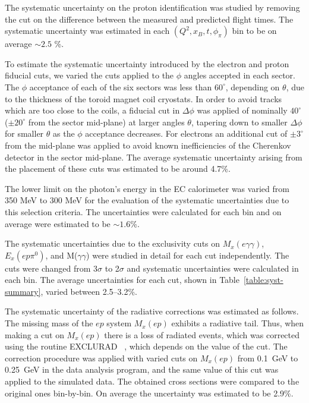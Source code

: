 \documentclass[prc,floatfix,twocolumn,superscriptaddress,letter]{revtex4}
\begin{document}
The systematic uncertainty on the  proton  identification was studied by removing the cut  on the
difference between the measured and predicted flight times. The systematic uncertainty was estimated  in each  $(Q^2, x_B, t, \phi_\pi)$ bin to be on average $\sim 2.5$ \%.

 To estimate the systematic uncertainty introduced by the electron and proton fiducial cuts, we varied  the cuts  applied to the $\phi$ angles accepted in each sector. The $\phi$ acceptance of each  of the six sectors was  less than $60^\circ$, depending on $\theta$, due to the thickness of the toroid magnet coil cryostats.   In order to avoid tracks which are too close to the coils, a fiducial cut in $\Delta\phi$ was applied of nominally $40^\circ$ ($\pm 20^\circ$ from the sector mid-plane) at larger angles $\theta$, tapering down to smaller $\Delta\phi$  for smaller $\theta$ as the  $\phi$ acceptance decreases. For electrons an additional cut of $\pm 3^\circ$ from the mid-plane was applied to avoid known inefficiencies of the Cherenkov detector in the sector mid-plane. The average systematic uncertainty arising from the placement of these cuts was estimated to be around 4.7\%.

The lower limit on the photon's energy in the EC calorimeter was varied from 350 MeV to 300 MeV for the evaluation of the systematic uncertainties due to this selection criteria. The uncertainties  were calculated for each bin and on average were  estimated to be $\sim1.6$\%.


The systematic uncertainties due to the exclusivity cuts on
 $M_x(e\gamma\gamma)$,
$E_x(ep\pi^0)$, and
M($\gamma\gamma$)
were studied in detail for each cut independently. The cuts were changed from 3$\sigma$ to 2$\sigma$ and
systematic uncertainties  were calculated in each bin. The average uncertainties for each cut, shown in Table~\ref{table:syst-summary}, varied between 2.5--3.2\%.


The systematic uncertainty of the radiative corrections was estimated as follows. The missing mass of the $ep$ system $M_x(ep)$ exhibits a radiative tail. Thus, when making a cut on $M_x(ep)$ there is a loss of radiated events, which was corrected using the routine EXCLURAD ~\cite{exclurad},  which depends on the value of the cut. The correction procedure was applied with varied cuts on $M_x(ep)$  from 0.1~GeV to 0.25~GeV in the data analysis program, and the same
value of this cut was applied to the simulated data.
The obtained cross sections were compared to the original ones bin-by-bin. On average the uncertainty was estimated to be 2.9\%.
\end{document}
